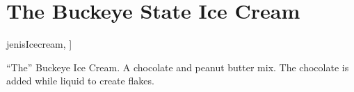 \section[Buckeye Ice Cream]{The Buckeye State Ice Cream}

\begin{recipestats}[
        servings=16,
        preptime=15~\minute,
        bakingtime=45~\minute,
        inactivetime=4~\hour,
        original=\citetitle{jenisIcecream}~\cite[p.~104]{jenisIcecream},
    ]
\end{recipestats}

\begin{recipeabstract}
    ``The'' Buckeye Ice Cream.
    A chocolate and peanut butter mix.
    The chocolate is added while liquid to create flakes.
\end{recipeabstract}

\begin{ingredientcolumns}
    \begin{ingredientblock}
        \\
        \\
        \\
        \\
    \end{ingredientblock}
    \begin{ingredientblock}
        \\
        \\
        \\
        \\
    \end{ingredientblock}
\end{ingredientcolumns}

